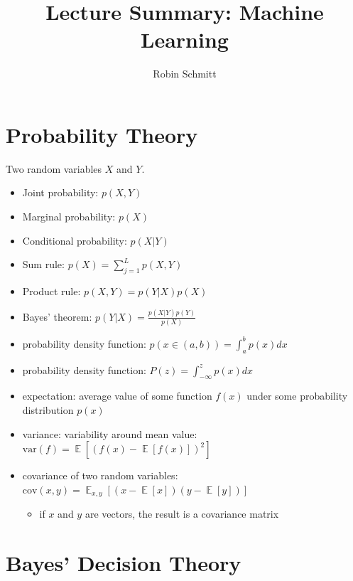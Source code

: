 \documentclass{article}
\title{Lecture Summary: Machine Learning}
\author{Robin Schmitt}
\DeclareMathOperator*{\E}{\mathbb{E}}
\begin{document}
\maketitle

\tableofcontents

\section{Probability Theory}

Two random variables $X$ and $Y$.

\begin{itemize}
  \item Joint probability: $p(X, Y)$
  \item Marginal probability: $p(X)$
  \item Conditional probability: $p(X|Y)$
  \item Sum rule: $p(X) = \sum_{j=1}^L p(X, Y)$
  \item Product rule: $p(X, Y) = p(Y|X)p(X)$
  \item Bayes' theorem: $p(Y|X) = \frac{p(X|Y)p(Y)}{p(X)}$
  \item probability density function: $p(x \in (a,b)) = \int_a^b p(x) dx$
  \item probability density function: $P(z) = \int_{-\infty}^z p(x) dx$
  \item expectation: average value of some function $f(x)$ under some probability distribution $p(x)$
  \item variance: variability around mean value: $\text{var}(f) = \E \left [ (f(x) - \E[f(x)])^2 \right ]$
  \item covariance of two random variables: $\text{cov}(x,y) = \E_{x,y} [(x-\E[x])(y-\E[y])]$
  \begin{itemize}
    \item if $x$ and $y$ are vectors, the result is a covariance matrix
  \end{itemize}
\end{itemize}

\section{Bayes' Decision Theory}
\end{document}
